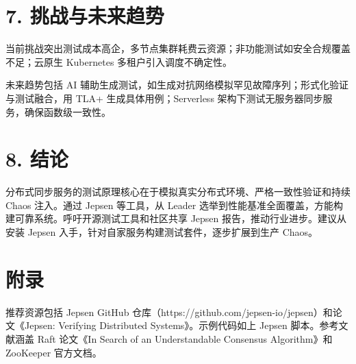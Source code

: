 \chapter{7. 挑战与未来趋势}
当前挑战突出测试成本高企，多节点集群耗费云资源；非功能测试如安全合规覆盖不足；云原生 Kubernetes 多租户引入调度不确定性。\par
未来趋势包括 AI 辅助生成测试，如生成对抗网络模拟罕见故障序列；形式化验证与测试融合，用 TLA+ 生成具体用例；Serverless 架构下测试无服务器同步服务，确保函数级一致性。\par
\chapter{8. 结论}
分布式同步服务的测试原理核心在于模拟真实分布式环境、严格一致性验证和持续 Chaos 注入。通过 Jepsen 等工具，从 Leader 选举到性能基准全面覆盖，方能构建可靠系统。呼吁开源测试工具和社区共享 Jepsen 报告，推动行业进步。建议从安装 Jepsen 入手，针对自家服务构建测试套件，逐步扩展到生产 Chaos。\par
\chapter{附录}
推荐资源包括 Jepsen GitHub 仓库（https://github.com/jepsen-io/jepsen）和论文《Jepsen: Verifying Distributed Systems》。示例代码如上 Jepsen 脚本。参考文献涵盖 Raft 论文《In Search of an Understandable Consensus Algorithm》和 ZooKeeper 官方文档。\par
